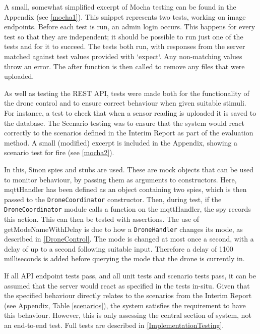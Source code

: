 \documentclass{article}
\begin{document}
A small, somewhat simplified excerpt of Mocha testing can be found in the Appendix (see \ref{mocha1}). This snippet represents two tests, working on image endpoints. Before each test is run, an admin login occurs. This happens for every test so that they are independent; it should be possible to run just one of the tests and for it to succeed. The tests both run, with responses from the server matched against test values provided with `expect`. Any non-matching values throw an error. The after function is then called to remove any files that were uploaded.  

As well as testing the REST API, tests were made both for the functionality of the drone control and to ensure correct behaviour when given suitable stimuli. For instance, a test to check that when a sensor reading is uploaded it is saved to the database. The Scenario testing was to ensure that the system would react correctly to the scenarios defined in the Interim Report as part of the evaluation method. A small (modified) excerpt is included in the Appendix, showing a scenario test for fire (see \ref{mocha2}).

In this, Sinon spies and stubs are used\cite{sinon}. These are mock objects that can be used to monitor behaviour, by passing them as arguments to constructors. Here, mqttHandler has been defined as an object containing two spies, which is then passed to the \texttt{DroneCoordinator} constructor. Then, during test, if the \texttt{DroneCoordinator} module calls a function on the mqttHandler, the spy records this action. This can then be tested with assertions. The use of getModeNameWithDelay is due to how a \texttt{DroneHandler} changes its mode, as described in \ref{DroneControl}. The mode is changed at most once a second, with a delay of up to a second following suitable input. Therefore a delay of 1100 milliseconds is added before querying the mode that the drone is currently in.

If all API endpoint tests pass, and all unit tests and scenario tests pass, it can be assumed that the server would react as specified in the tests in-situ. Given that the specified behaviour directly relates to the scenarios from the Interim Report (see Appendix, Table \ref{scenarios}), the system satisfies the requirement to have this behaviour. However, this is only assessing the central section of system, not an end-to-end test. Full tests are described in \ref{ImplementationTesting}.
\end{document}
